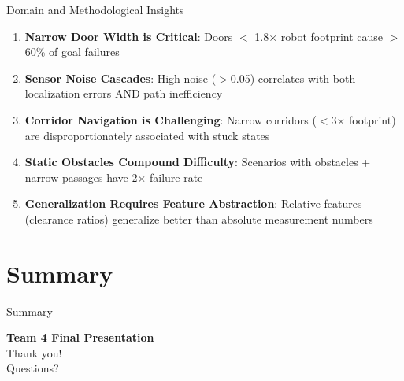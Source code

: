\documentclass[aspectratio=169, 11pt]{beamer}
\newcommand{\fullsectiontitle}{}
\newcommand{\presentationsection}[2][]{%
  \gdef\fullsectiontitle{#2}%
  \section[#1]{#2}%
}
\begin{document}
\begin{frame}{Domain and Methodological Insights}
  \begin{enumerate}
    \item \textbf{Narrow Door Width is Critical}: Doors $<$ 1.8× robot footprint cause $>$60\% of goal failures
    
    \vspace{0.2cm}
    
    \item \textbf{Sensor Noise Cascades}: High noise ($>$0.05) correlates with both localization errors AND path inefficiency
    
    \vspace{0.2cm}
    
    \item \textbf{Corridor Navigation is Challenging}: Narrow corridors ($<$3× footprint) are disproportionately associated with stuck states
    
    \vspace{0.2cm}
    
    \item \textbf{Static Obstacles Compound Difficulty}: Scenarios with obstacles + narrow passages have 2× failure rate
    
    \vspace{0.2cm}
    
    \item \textbf{Generalization Requires Feature Abstraction}: Relative features (clearance ratios) generalize better than absolute measurement numbers
  \end{enumerate}
\end{frame}

\presentationsection[Summary]{Summary}

\begin{frame}{Summary}
  \begin{center}
    \Large\textcolor{uniblue}{\textbf{Team 4 Final Presentation}}\\
    \vspace{0.5cm}
    \normalsize Thank you!\\
    \vspace{0.3cm}
    Questions?
  \end{center}
\end{frame}
\fi
\end{document}
